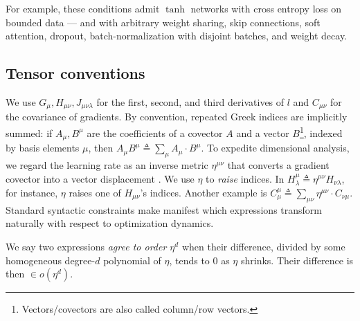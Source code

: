 \documentclass{article}
\theoremstyle{plain}
\theoremstyle{definition}
\begin{document}

        For example, these conditions admit $\tanh$ networks with cross entropy
        loss on bounded data --- and with arbitrary weight sharing, skip
        connections, soft attention, dropout, batch-normalization with disjoint
        batches, and weight decay.
        

    \subsection{Tensor conventions}
        We use $G_\mu, H_{\mu\nu}, J_{\mu\nu\lambda}$ for the first, second,
        and third derivatives of $l$ and $C_{\mu \nu}$ for the covariance of
        gradients.  By convention, repeated Greek indices are implicitly
        summed: if $A_\mu, B^\mu$ are the coefficients of a covector $A$ and a
        vector
        $B$\footnote{
            Vectors/covectors are also called column/row vectors.
        }, indexed by basis elements $\mu$, then
        $
            A_\mu B^\mu
            \triangleq
            \sum_\mu A_\mu \cdot B^\mu
        $.
        To expedite dimensional analysis, we regard the learning rate as an
        inverse metric $\eta^{\mu\nu}$ that converts a gradient covector into a
        vector displacement \citep{bo13}.  We use $\eta$ to \emph{raise}
        indices.  In
        $
            H^{\mu}_{\lambda}
            \triangleq
            \eta^{\mu\nu} H_{\nu\lambda}
        $, for instance,
        $\eta$ raises one of $H_{\mu\nu}$'s indices.  Another example is
        $
            C^{\mu}_{\mu}
            \triangleq
            \sum_{\mu \nu} \eta^{\mu\nu} \cdot C_{\nu\mu}
        $.
        Standard syntactic constraints make manifest which expressions
        transform naturally with respect to optimization dynamics.  

        We say two expressions \emph{agree to order $\eta^d$} when
        their difference, divided by some homogeneous degree-$d$
        polynomial of $\eta$, tends to $0$ as $\eta$ shrinks.  Their
        difference is then $\in o(\eta^d)$.
        
\end{document}
